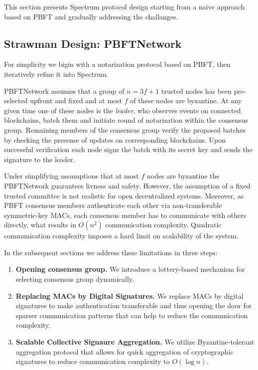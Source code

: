 This section presents Spectrum protocol design starting from a naive approach based on PBFT and gradually addressing the challanges.

\subsection{Strawman Design: PBFTNetwork}\label{subsec:strawman-design}

For simplicity we bigin with a notarization protocol based on PBFT, then iteratively refine it into Spectrum.

PBFTNetwork assumes that a group of $n = 3f + 1$ trusted nodes has been pre-selected upfront and fixed and at most $f$ of these nodes are byzantine.
At any given time one of these nodes is the \emph{leader}, who observes events on connected blockchains,
batch them and initiate round of notarization within the consensus group.
Remaining members of the consensus group verify the proposed batches by checking the presense of updates on corresponding blockchains.
Upon successful verification each node signs the batch with its secret key and sends the signature to the leader.

Under simplifying assumptions that at most $f$ nodes are byzantine the PBFTNetwork guarantees livness and safety.
However, the assumption of a fixed trusted committee is not realistic for open decentralized systems.
Moreover, as PBFT consensus members authenticate each other via non-transferable symmetric-key MACs, each consensus
member has to communicate with others directly, what results in $O(n^2)$ communication complexity.
Quadratic communication complexity imposes a hard limit on scalability of the system.

In the subsequent sections we address these limitations in three steps:
\begin{enumerate}
    \item \textbf{Opening consensus group.} We introduce a lottery-based mechanism for selecting consensus group dynamically.
    \item \textbf{Replacing MACs by Digital Signatures.} We replace MACs by digital signatures to make authentication transferable
    and thus opening the door for sparser communication patterns that can help to reduce the communication complexity.
    \item \textbf{Scalable Collective Signaure Aggregation.} We utilize Byzantine-tolerant aggregation protocol that allows for
    quick aggregation of cryptographic signatures to reduce communication complexity to $O(\log n)$.
\end{enumerate}

